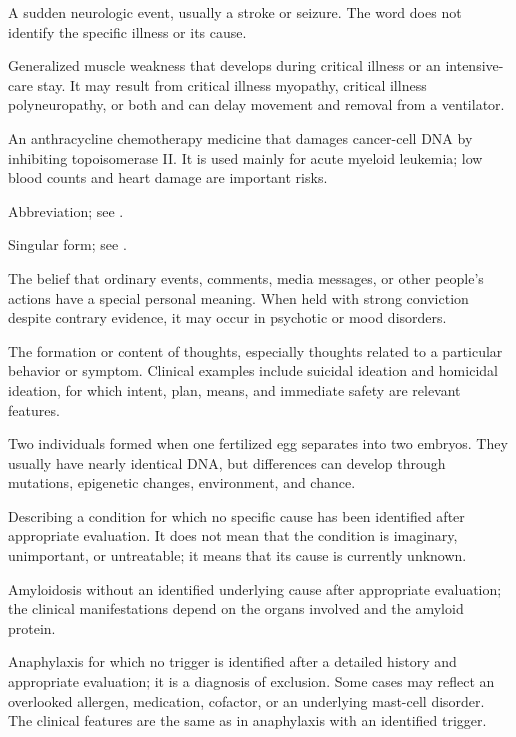  A sudden neurologic event, usually a stroke or seizure. The word does not identify the specific illness or its cause.

 Generalized muscle weakness that develops during critical illness or an intensive-care stay. It may result from critical illness myopathy, critical illness polyneuropathy, or both and can delay movement and removal from a ventilator.

 An anthracycline chemotherapy medicine that damages cancer-cell DNA by inhibiting topoisomerase II. It is used mainly for acute myeloid leukemia; low blood counts and heart damage are important risks.

 Abbreviation; see .

 Singular form; see .

 The belief that ordinary events, comments, media messages, or other people’s actions have a special personal meaning. When held with strong conviction despite contrary evidence, it may occur in psychotic or mood disorders.

 The formation or content of thoughts, especially thoughts related to a particular behavior or symptom. Clinical examples include suicidal ideation and homicidal ideation, for which intent, plan, means, and immediate safety are relevant features.

 Two individuals formed when one fertilized egg separates into two embryos. They usually have nearly identical DNA, but differences can develop through mutations, epigenetic changes, environment, and chance.

 Describing a condition for which no specific cause has been identified after appropriate evaluation. It does not mean that the condition is imaginary, unimportant, or untreatable; it means that its cause is currently unknown.

 Amyloidosis without an identified underlying cause after appropriate evaluation; the clinical manifestations depend on the organs involved and the amyloid protein.

 Anaphylaxis for which no trigger is identified after a detailed history and appropriate evaluation; it is a diagnosis of exclusion.
Some cases may reflect an overlooked allergen, medication, cofactor, or an
underlying mast-cell disorder. The clinical features are the same as in
anaphylaxis with an identified trigger.

